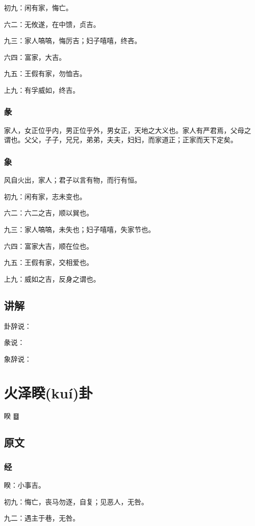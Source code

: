 \documentclass[12pt,oneside]{book}
\begin{document}
初九：闲有家，悔亡。

六二：无攸遂，在中馈，贞吉。

九三：家人嗃嗃，悔厉吉；妇子嘻嘻，终吝。

六四：富家，大吉。

九五：王假有家，勿恤吉。

上九：有孚威如，终吉。

\subsection{彖}
家人，女正位乎内，男正位乎外，男女正，天地之大义也。家人有严君焉，父母之谓也。父父，子子，兄兄，弟弟，夫夫，妇妇，而家道正；正家而天下定矣。

\subsection{象}
风自火出，家人；君子以言有物，而行有恒。

初九：闲有家，志未变也。

六二：六二之吉，顺以巽也。

九三：家人嗃嗃，未失也；妇子嘻嘻，失家节也。

六四：富家大吉，顺在位也。

九五：王假有家，交相爱也。

上九：威如之吉，反身之谓也。

\section{讲解}
卦辞说：

彖说：

象辞说：

\chapter{火泽睽(kuí)卦}
睽 {\Large ䷥}

\section{原文}

\subsection{经}
睽：小事吉。

初九：悔亡，丧马勿逐，自复；见恶人，无咎。

九二：遇主于巷，无咎。
\end{document}
